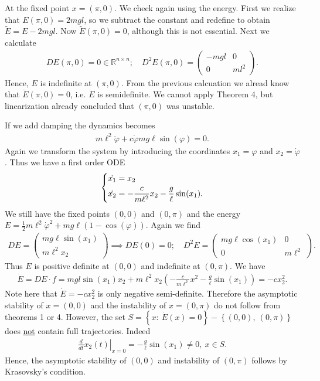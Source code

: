 \begin{ex}
At the fixed point $x = (\pi, 0)$. We check again using the energy. First we realize that $E(\pi, 0)= 2mgl$, so we subtract the constant and redefine to obtain $\tilde{E}= E - 2mgl$. Now $\tilde{E}(\pi, 0) = 0$, although this is not essential. Next we calculate
\begin{align}
	DE(\pi, 0) = 0\in \mathbb{R}^{n\times n};\quad D^2E(\pi, 0) = 
	\begin{pmatrix}
		-mgl & 0 \\
		0 & ml^2
	\end{pmatrix}
	.
\end{align}
Hence, $E$ is indefinite at $(\pi, 0)$. From the previous calcuation we alread know that $\dot{E}(\pi, 0) = 0$, i.e. $\dot{E}$ is semidefinite. We cannot apply Theorem 4, but linearization already concluded that $(\pi,0)$ was unstable.

If we add damping the dynamics becomes
\begin{align}
	m\ell^2 \ddot{\varphi} + c \dot{\varphi} mg\ell \sin(\varphi) =0.
\end{align}
Again we transform the system by introducing the coordinates $x_1 =\varphi$ and $x_2=\dot{\varphi}$. Thus we have a first order ODE
\begin{align}
	\begin{dcases}
		\dot{x_1} = x_2 \\
		\dot{x_2} = - \frac{c}{m\ell^2}x_2 - \frac{g}{\ell}\sin(x_1).
	\end{dcases}
\end{align}
We still have the fixed points $(0,0)$ and $(0, \pi)$ and the energy $E = \frac{1}{2}m \ell^2 \dot{\varphi}^2 + mg \ell(1 - \cos(\varphi))$. Again we find
\begin{align}
	DE =
	\begin{pmatrix}
		mg\ell \sin(x_1) \\ m \ell^2 x_2
	\end{pmatrix}
	\implies DE(0) = 0;\quad
	D^2E =
	\begin{pmatrix}
		mg\ell \cos(x_1) & 0 \\
		0 & m \ell^2
	\end{pmatrix}
	.
\end{align}
Thus $E$ is positive definite at $(0,0)$ and indefinite at $(0, \pi )$. We have
\begin{align}
	\dot{E} = DE \cdot f = mgl \sin(x_1)x_2 + m\ell^2 x_2 \left(-\frac{c}{m\ell^2}x^2 - \frac{g}{\ell}\sin(x_1)\right) = - cx_2^2.
\end{align}
Note here that $\dot{E}= -cx_2^2$ is only negative semi-definite. Therefore the asymptotic stability of $x=(0,0)$ and the instability of $x=(0,\pi )$ do not follow from theorems 1 or 4. However, the set $S=\left\{x:\ \dot{E}(x)=0\right\} - \left\{(0,0),\ (0,\pi )\right\}$ does \underline{not} contain full trajectories. Indeed
\begin{align}
	\left.\frac{d}{dt}x_2(t)\right|_{x=0} = -\frac{g}{\ell}\sin(x_1) \neq 0,\ x\in S.
\end{align}
Hence, the asymptotic stability of $(0,0)$ and instability of $(0,\pi )$ follows by Krasovsky's condition.
\end{ex}
